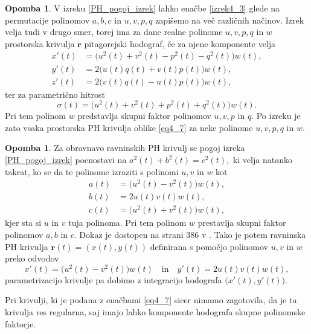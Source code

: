 \documentclass[12pt,a4paper,twoside]{article}
\theoremstyle{definition} %
\newtheorem{opomba}[definicija]{Opomba}
\theoremstyle{plain} %
\theoremstyle{primerstyle}
\numberwithin{equation}{section}  %
\newcommand{\rV}{\mathbf{r}}
\begin{document}
\begin{opomba}
	\label{opomba_PH_pogoj_izrek}
	V izreku \ref{PH_pogoj_izrek} lahko enačbe \eqref{izrek4_3} glede na permutacije polinomov $a,b,c$ in $u,v,p,q$ zapišemo na več različnih načinov. Izrek velja tudi v drugo smer, torej ima za dane realne polinome $u,v,p,q$ in $w$ prostorska krivulja $\rV$ pitagorejski hodograf, če za njene komponente velja
	\begin{align}
		x'(t)&=\big(u^2(t)+v^2(t)-p^2(t)-q^2(t)\big)w(t), \nonumber \\
		y'(t)&=2\big(u(t)q(t)+v(t)p(t)\big)w(t), \label{eq4_7} \\
		z'(t)&=2\big(v(t)q(t)-u(t)p(t)\big)w(t), \nonumber
	\end{align}
	ter za parametrično hitrost
	\begin{equation}
		\label{eq4_8}
		\sigma(t)=\big(u^2(t)+v^2(t)+p^2(t)+q^2(t)\big)w(t).
	\end{equation}
	Pri tem polinom $w$ predstavlja skupni faktor polinomov $u,v,p$ in $q.$ Po izreku je zato vsaka prostorska PH krivulja oblike \ref{eq4_7} za neke polinome $u,v,p,q$ in $w.$
\end{opomba}

\begin{opomba}
	\label{opomba1}
	Za obravnavo ravninskih PH krivulj se pogoj izreka \ref{PH_pogoj_izrek} poenostavi na $a^2(t)+b^2(t)=c^2(t),$ ki velja natanko takrat, ko se da te polinome izraziti s polinomi $u,v$ in $w$ kot
	\begin{align}
		a(t)&=\big(u^2(t)-v^2(t)\big)w(t),\nonumber\\
		b(t)&=2u(t)v(t)w(t),\label{ravninska_PH}\\
		c(t)&=\big(u^2(t)+v^2(t)\big)w(t),\nonumber
	\end{align}
	kjer sta si $u$ in $v$ tuja polinoma. Pri tem polinom $w$ prestavlja skupni faktor polinomov $a,b$ in $c.$ Dokaz je dostopen na strani 386 v \cite{farouki2008pythagorean}. Tako je potem ravninska PH krivulja $\rV(t)=(x(t),y(t))$ definirana s pomočjo polinomov $u,v$ in $w$ preko odvodov
	\begin{equation}
		\label{poly_ravninska_PH}
		x'(t)=\big(u^2(t)-v^2(t)\big)w(t)\quad\text{in}\quad y'(t)=2u(t)v(t)w(t),
	\end{equation}
	parametrizacijo krivulje pa dobimo z integracijo hodografa $\big(x'(t),y'(t)\big).$
\end{opomba}

Pri krivulji, ki je podana z enačbami \eqref{eq4_7} sicer nimamo zagotovila, da je ta krivulja res regularna, saj imajo lahko komponente hodografa skupne polinomske faktorje.
\end{document}
